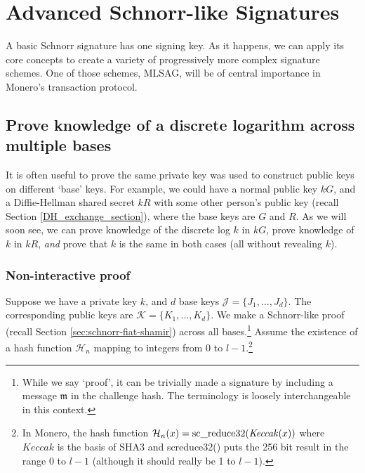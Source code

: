 \chapter{Advanced Schnorr-like Signatures}
\label{chapter:advanced-schnorr}

A basic Schnorr signature has one signing key. As it happens, we can apply its core concepts to create a variety of progressively more complex signature schemes. One of those schemes, MLSAG, will be of central importance in Monero's transaction protocol.



\section{Prove knowledge of a discrete logarithm across multiple bases}
\label{sec:proofs-discrete-logarithm-multiple-bases}

It is often useful to prove the same private key was used to construct public keys on different `base' keys. For example, we could have a normal public key $k G$, and a Diffie-Hellman shared secret $k R$ with some other person's public key (recall Section \ref{DH_exchange_section}), where the base keys are $G$ and $R$. As we will soon see, we can prove knowledge of the discrete log $k$ in $k G$, prove knowledge of $k$ in $k R$, {\em and} prove that $k$ is the same in both cases (all without revealing $k$).


\subsection*{Non-interactive proof}

Suppose we have a private key $k$, and $d$ base keys $\mathcal{J} = \{J_1,...,J_d\}$. The corresponding public keys are $\mathcal{K} = \{K_1,...,K_d\}$. We make a Schnorr-like proof (recall Section \ref{sec:schnorr-fiat-shamir}) across all bases.\footnote{While we say `proof', it can be trivially made a signature by including a message $\mathfrak{m}$ in the challenge hash. The terminology is loosely interchangeable in this context.} Assume the existence of a hash function \(\mathcal{H}_n\) 
mapping to integers from 0 to $l-1$.\footnote{In Monero, the hash function $\mathcal{H}_n(x) = \textrm{sc\textunderscore reduce32}(\mathit{Keccak}(x))$ where $\mathit{Keccak}$ is the basis of SHA3 and sc\textunderscore reduce32() puts the 256 bit result in the range 0 to $l-1$ (although it should really be 1 to $l-1$).} 

